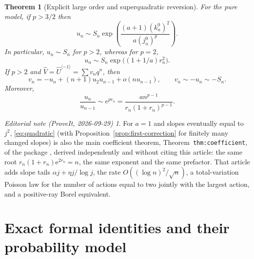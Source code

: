 \documentclass[11pt,a4paper]{article}
\numberwithin{equation}{section}
\newtheorem{theorem}{Theorem}[section]
\theoremstyle{definition}
\theoremstyle{remark}
\newtheorem*{ednote}{Editorial note (ProveIt, 2026-09-29)}
\newcommand{\ee}{\mathrm e}\newcommand{\dd}{\mathrm d}
\newcommand{\Uhat}{\widehat U}\newcommand{\Vhat}{\widehat V}
\begin{document}
\begin{theorem}[Explicit large order and superquadratic reversion]
\label{thm:explicit}
For the pure model, if $p>3/2$ then
\begin{equation}
 u_n\sim S_n
  \exp\!\left(\frac{(a+1)(k_n^0)^2}{a(j_n^0)^p}\right).
 \label{eq:first-correction}
\end{equation}
In particular, $u_n\sim S_n$ for $p>2$, whereas for $p=2$,
\begin{equation}
 \boxed{\qquad u_n\sim S_n\exp\!\bigl((1+1/a)r_n^2\bigr).\qquad}
 \label{eq:quadratic}
\end{equation}
If $p>2$ and $\Vhat=\Uhat^{\langle-1\rangle}=\sum v_nq^n$, then
\begin{equation}
 v_n=-u_n+(n+1)u_2u_{n-1}+o(nu_{n-1}),
 \qquad v_n\sim-u_n\sim-S_n.
 \label{eq:inverse}
\end{equation}
Moreover,
\begin{equation}
 \frac{u_n}{u_{n-1}}\sim e^{pr_n}
 =\frac{a n^{p-1}}{r_n(1+r_n)^{p-1}}.
 \label{eq:ratio}
\end{equation}
\end{theorem}

\begin{ednote}
For $a=1$ and slopes eventually equal to $j^2$, \eqref{eq:quadratic}
(with Proposition~\ref{prop:first-correction} for finitely many changed
slopes) is also the main coefficient theorem, Theorem~\texttt{thm:coefficient},
of the package \cite{ed:mic}, derived independently and without citing this
article: the same root $r_n(1+r_n)\ee^{2r_n}=n$, the same exponent and the
same prefactor. That article adds slope tails $\alpha j+\eta j/\log j$,
the rate $O((\log n)^2/\sqrt n)$, a total-variation Poisson law for the
number of actions equal to two jointly with the largest action, and a
positive-ray Borel equivalent.
\end{ednote}

\section{Exact formal identities and their probability model}
\label{sec:formal}
\end{document}
